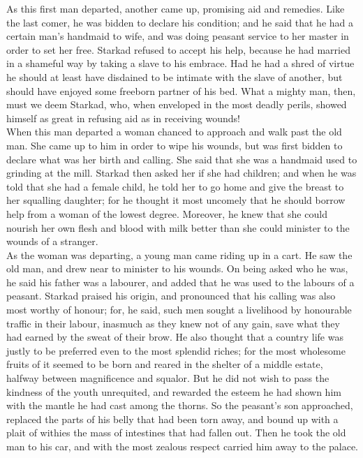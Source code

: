 \documentclass[10pt,a4paper]{report}
\begin{document}
As this first man departed, another came up, promising aid and remedies. Like the last comer, he was bidden to declare his condition; and he said that he had a certain man's handmaid to wife, and was doing peasant service to her master in order to set her free. Starkad refused to accept his help, because he had married in a shameful way by taking a slave to his embrace. Had he had a shred of virtue he should at least have disdained to be intimate with the slave of another, but should have enjoyed some freeborn partner of his bed. What a mighty man, then, must we deem Starkad, who, when enveloped in the most deadly perils, showed himself as great in refusing aid as in receiving wounds!\\

When this man departed a woman chanced to approach and walk past the old man. She came up to him in order to wipe his wounds, but was first bidden to declare what was her birth and calling. She said that she was a handmaid used to grinding at the mill. Starkad then asked her if she had children; and when he was told that she had a female child, he told her to go home and give the breast to her squalling daughter; for he thought it most uncomely that he should borrow help from a woman of the lowest degree. Moreover, he knew that she could nourish her own flesh and blood with milk better than she could minister to the wounds of a stranger.\\

As the woman was departing, a young man came riding up in a cart. He saw the old man, and drew near to minister to his wounds. On being asked who he was, he said his father was a labourer, and added that he was used to the labours of a peasant. Starkad praised his origin, and pronounced that his calling was also most worthy of honour; for, he said, such men sought a livelihood by honourable traffic in their labour, inasmuch as they knew not of any gain, save what they had earned by the sweat of their brow. He also thought that a country life was justly to be preferred even to the most splendid riches; for the most wholesome fruits of it seemed to be born and reared in the shelter of a middle estate, halfway between magnificence and squalor. But he did not wish to pass the kindness of the youth unrequited, and rewarded the esteem he had shown him with the mantle he had cast among the thorns. So the peasant's son approached, replaced the parts of his belly that had been torn away, and bound up with a plait of withies the mass of intestines that had fallen out. Then he took the old man to his car, and with the most zealous respect carried him away to the palace.\\
\end{document}

